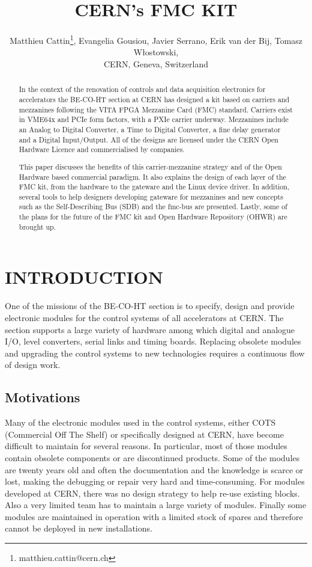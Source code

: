 \documentclass{JAC2003}
\begin{document}
\title{CERN's FMC KIT}

\author{Matthieu Cattin\thanks{matthieu.cattin@cern.ch}, Evangelia Gousiou, Javier Serrano, Erik van der Bij, Tomasz W\l{}ostowski,\\
CERN, Geneva, Switzerland}

\maketitle

\begin{abstract}
  In the context of the renovation of controls and data acquisition electronics for accelerators the BE-CO-HT section at CERN has designed a kit based on carriers and mezzanines following the VITA FPGA Mezzanine Card (FMC) standard. Carriers exist in VME64x and PCIe form factors, with a PXIe carrier underway. Mezzanines include an Analog to Digital Converter, a Time to Digital Converter, a fine delay generator and a Digital Input/Output. All of the designs are licensed under the CERN Open Hardware Licence and commercialised by companies.

This paper discusses the benefits of this carrier-mezzanine strategy and of the Open Hardware based commercial paradigm.
It also explains the design of each layer of the FMC kit, from the hardware to the gateware and the Linux device driver.
In addition, several tools to help designers developing gateware for mezzanines and new concepts such as the Self-Describing Bus (SDB) and the fmc-bus are presented.
Lastly, some of the plans for the future of the FMC kit and Open Hardware Repository (OHWR) are brought up.
\end{abstract}


\section{INTRODUCTION}
One of the missions of the BE-CO-HT section is to specify, design and provide electronic modules for the control systems of all accelerators at CERN.
The section supports a large variety of hardware among which digital and analogue I/O, level converters, serial links and timing boards.
Replacing obsolete modules and upgrading the control systems to new technologies requires a continuous flow of design work.

\subsection{Motivations}
Many of the electronic modules used in the control systems, either COTS (Commercial Off The Shelf) or specifically designed at CERN, have become difficult to maintain for several reasons.
In particular, most of those modules contain obsolete components or are discontinued products.
Some of the modules are twenty years old and often the documentation and the knowledge is scarce or lost, making the debugging or repair very hard and time-consuming.
For modules developed at CERN, there was no design strategy to help re-use existing blocks.
Also a very limited team has to maintain a large variety of modules.
Finally some modules are maintained in operation with a limited stock of spares and therefore cannot be deployed in new installations.
\end{document}
